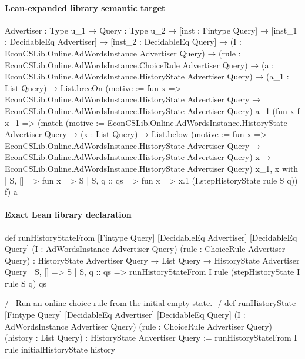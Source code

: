 \documentclass[10pt]{article}
\begin{document}
\paragraph{Lean-expanded library semantic target}
\begin{ReviewVerbatim}
{Advertiser : Type u_1} →
  {Query : Type u_2} →
    [inst : Fintype Query] →
      [inst_1 : DecidableEq Advertiser] →
        [inst_2 : DecidableEq Query] →
          (I : EconCSLib.Online.AdWordsInstance Advertiser Query) →
            (rule : EconCSLib.Online.AdWordsInstance.ChoiceRule Advertiser Query) →
              (a : EconCSLib.Online.AdWordsInstance.HistoryState Advertiser Query) →
                (a_1 : List Query) →
                  List.brecOn (motive := fun x =>
                    EconCSLib.Online.AdWordsInstance.HistoryState Advertiser Query →
                      EconCSLib.Online.AdWordsInstance.HistoryState Advertiser Query)
                    a_1
                    (fun x f x_1 =>
                      (match (motive :=
                          EconCSLib.Online.AdWordsInstance.HistoryState Advertiser Query →
                            (x : List Query) →
                              List.below (motive := fun x =>
                                  EconCSLib.Online.AdWordsInstance.HistoryState Advertiser Query →
                                    EconCSLib.Online.AdWordsInstance.HistoryState Advertiser Query)
                                  x →
                                EconCSLib.Online.AdWordsInstance.HistoryState Advertiser Query)
                          x_1, x with
                        | S, [] => fun x => S
                        | S, q :: qs => fun x => x.1 (I.stepHistoryState rule S q))
                        f)
                    a
\end{ReviewVerbatim}

\paragraph{Exact Lean library declaration}
\begin{ReviewVerbatim}
def runHistoryStateFrom
    [Fintype Query] [DecidableEq Advertiser] [DecidableEq Query]
    (I : AdWordsInstance Advertiser Query)
    (rule : ChoiceRule Advertiser Query) :
    HistoryState Advertiser Query → List Query → HistoryState Advertiser Query
  | S, [] => S
  | S, q :: qs => runHistoryStateFrom I rule (stepHistoryState I rule S q) qs

/-- Run an online choice rule from the initial empty state. -/
def runHistoryState
    [Fintype Query] [DecidableEq Advertiser] [DecidableEq Query]
    (I : AdWordsInstance Advertiser Query)
    (rule : ChoiceRule Advertiser Query) (history : List Query) :
    HistoryState Advertiser Query :=
  runHistoryStateFrom I rule initialHistoryState history
\end{ReviewVerbatim}
\end{document}
